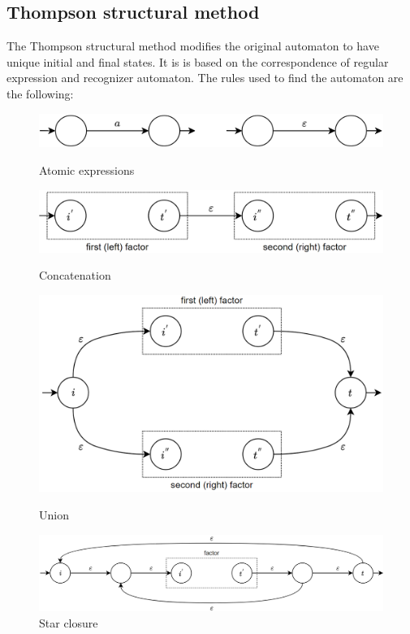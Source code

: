 \subsection{Thompson structural method}
The Thompson structural method modifies the original automaton to have unique initial and final states.
It is is based on the correspondence of regular expression and recognizer automaton. 
The rules used to find the automaton are the following: 
\begin{figure}[H] 
    \begin{minipage}[b]{0.5\linewidth}
        \centering
        \includegraphics[width=.9\linewidth]{images/t1.png} 
        \caption*{Atomic expressions} 
        \vspace{4ex}
    \end{minipage}%
    \begin{minipage}[b]{0.5\linewidth}
        \centering
        \includegraphics[width=.9\linewidth]{images/t2.png} 
        \caption*{Concatenation} 
        \vspace{4ex}
    \end{minipage} 
    \begin{minipage}[b]{0.5\linewidth}
        \centering
        \includegraphics[width=.8\linewidth]{images/t3.png} 
        \caption*{Union} 
        \vspace{4ex}
    \end{minipage}%
    \begin{minipage}[b]{0.5\linewidth}
        \centering
        \includegraphics[width=.9\linewidth]{images/t4.png} 
        \caption*{Star closure} 
        \vspace{4ex}
    \end{minipage} 
\end{figure}
